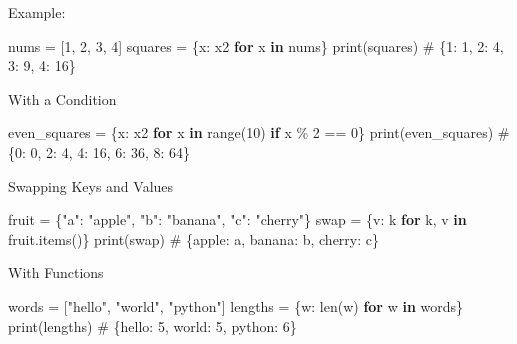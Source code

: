 \documentclass[
  letterpaper,
  DIV=11,
  numbers=noendperiod]{scrreprt}
\newenvironment{Shaded}{\begin{snugshade}}{\end{snugshade}}
\newcommand{\BuiltInTok}[1]{\textcolor[rgb]{0.00,0.23,0.31}{#1}}
\newcommand{\CommentTok}[1]{\textcolor[rgb]{0.37,0.37,0.37}{#1}}
\newcommand{\ControlFlowTok}[1]{\textcolor[rgb]{0.00,0.23,0.31}{\textbf{#1}}}
\newcommand{\DecValTok}[1]{\textcolor[rgb]{0.68,0.00,0.00}{#1}}
\newcommand{\KeywordTok}[1]{\textcolor[rgb]{0.00,0.23,0.31}{\textbf{#1}}}
\newcommand{\NormalTok}[1]{\textcolor[rgb]{0.00,0.23,0.31}{#1}}
\newcommand{\OperatorTok}[1]{\textcolor[rgb]{0.37,0.37,0.37}{#1}}
\newcommand{\StringTok}[1]{\textcolor[rgb]{0.13,0.47,0.30}{#1}}
\begin{document}
Example:

\begin{Shaded}
\begin{Highlighting}[]
\NormalTok{nums }\OperatorTok{=}\NormalTok{ [}\DecValTok{1}\NormalTok{, }\DecValTok{2}\NormalTok{, }\DecValTok{3}\NormalTok{, }\DecValTok{4}\NormalTok{]}
\NormalTok{squares }\OperatorTok{=}\NormalTok{ \{x: x2 }\ControlFlowTok{for}\NormalTok{ x }\KeywordTok{in}\NormalTok{ nums\}}
\BuiltInTok{print}\NormalTok{(squares)   }\CommentTok{\# \{1: 1, 2: 4, 3: 9, 4: 16\}}
\end{Highlighting}
\end{Shaded}

With a Condition

\begin{Shaded}
\begin{Highlighting}[]
\NormalTok{even\_squares }\OperatorTok{=}\NormalTok{ \{x: x2 }\ControlFlowTok{for}\NormalTok{ x }\KeywordTok{in} \BuiltInTok{range}\NormalTok{(}\DecValTok{10}\NormalTok{) }\ControlFlowTok{if}\NormalTok{ x }\OperatorTok{\%} \DecValTok{2} \OperatorTok{==} \DecValTok{0}\NormalTok{\}}
\BuiltInTok{print}\NormalTok{(even\_squares)   }\CommentTok{\# \{0: 0, 2: 4, 4: 16, 6: 36, 8: 64\}}
\end{Highlighting}
\end{Shaded}

Swapping Keys and Values

\begin{Shaded}
\begin{Highlighting}[]
\NormalTok{fruit }\OperatorTok{=}\NormalTok{ \{}\StringTok{"a"}\NormalTok{: }\StringTok{"apple"}\NormalTok{, }\StringTok{"b"}\NormalTok{: }\StringTok{"banana"}\NormalTok{, }\StringTok{"c"}\NormalTok{: }\StringTok{"cherry"}\NormalTok{\}}
\NormalTok{swap }\OperatorTok{=}\NormalTok{ \{v: k }\ControlFlowTok{for}\NormalTok{ k, v }\KeywordTok{in}\NormalTok{ fruit.items()\}}
\BuiltInTok{print}\NormalTok{(swap)   }\CommentTok{\# \{\textquotesingle{}apple\textquotesingle{}: \textquotesingle{}a\textquotesingle{}, \textquotesingle{}banana\textquotesingle{}: \textquotesingle{}b\textquotesingle{}, \textquotesingle{}cherry\textquotesingle{}: \textquotesingle{}c\textquotesingle{}\}}
\end{Highlighting}
\end{Shaded}

With Functions

\begin{Shaded}
\begin{Highlighting}[]
\NormalTok{words }\OperatorTok{=}\NormalTok{ [}\StringTok{"hello"}\NormalTok{, }\StringTok{"world"}\NormalTok{, }\StringTok{"python"}\NormalTok{]}
\NormalTok{lengths }\OperatorTok{=}\NormalTok{ \{w: }\BuiltInTok{len}\NormalTok{(w) }\ControlFlowTok{for}\NormalTok{ w }\KeywordTok{in}\NormalTok{ words\}}
\BuiltInTok{print}\NormalTok{(lengths)   }\CommentTok{\# \{\textquotesingle{}hello\textquotesingle{}: 5, \textquotesingle{}world\textquotesingle{}: 5, \textquotesingle{}python\textquotesingle{}: 6\}}
\end{Highlighting}
\end{Shaded}
\end{document}
